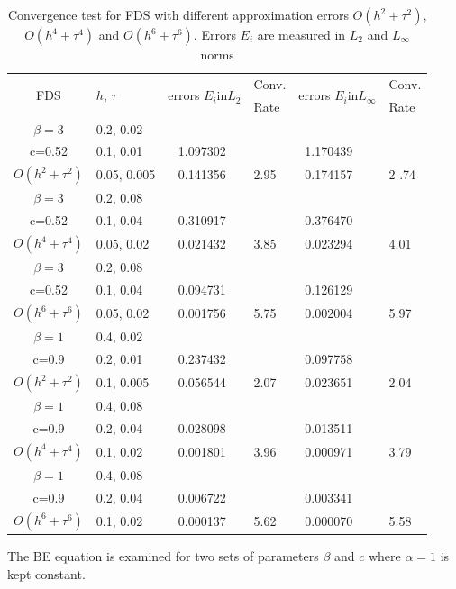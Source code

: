 \documentclass[11pt,a4paper,twoside]{article}
\begin{document}
\begin{table}[ht]
\centering
		\begin{tabular}{||c|l|ll|ll||}
			\hline
			\hline
      \multirow{2  }{*}{FDS}        & \multirow{2  }{*}{$h$, $\tau$}  & \multirow{2  }{*}{errors $E_i$in$L_2$}  &Conv.& \multirow{2  }{*}{errors $E_i$in$L_\infty$}  &Conv.  \\
	         &                    &                               & Rate   &                                        & Rate \\
   			\hline 
					\hline 
  $\beta=3$       &0.2, 0.02   &            &        &                  &      \\
      c=0.52   &0.1, 0.01   &~ 1.097302 &           &~1.170439      &       \\
     $O(h^2 + \tau^ 2)$ &0.05, 0.005 &~ 0.141356 &2.95  &~0.174157 & 2 .74       \\
			\hline 
   $\beta=3$        &0.2, 0.08   &            &        &                  &      \\
   c=0.52   &0.1, 0.04   &~ 0.310917 &           &~0.376470      &       \\
     $O(h^4+ \tau^4)$ &0.05, 0.02 &~ 0.021432 &3.85 &~0.023294 & 4.01        \\
			\hline 
  $\beta=3$               &0.2, 0.08   &            &        &                  &      \\
   c=0.52                  &0.1, 0.04       &~ 0.094731 &           &~0.126129      &       \\
     $O(h^6+ \tau^6)$ &0.05, 0.02 &~ 0.001756 &5.75    &~0.002004 & 5.97       \\
	   \hline
			\hline 
       $\beta=1$       &0.4, 0.02        &             &            &           &   \\
                  c=0.9    &0.2, 0.01       &~ 0.237432  &            &~0.097758 &   \\
  $O(h^2+ \tau^2)$ &0.1, 0.005   &~ 0.056544  &2.07  &~0.023651 & 2.04 \\
			\hline
      $\beta=1$    &0.4, 0.08    &            &            &             &    \\
       c=0.9 &0.2, 0.04    &~ 0.028098   &           &~0.013511  &   \\
       $O(h^4+ \tau^4)$ &0.1, 0.02   &~ 0.001801 & 3.96    &~0.000971  & 3.79  \\
    \hline
  $\beta=1$     &0.4, 0.08   &            &          &                  &      \\
      c=0.9    &0.2, 0.04   &~ 0.006722 &           &~0.003341      &       \\
     $O(h^6+ \tau^6)$ &0.1, 0.02 &~ 0.000137 &5.62  &~0.000070 & 5.58        \\
	   \hline
			\hline 
		\end{tabular}
		\caption{Convergence test for FDS with different approximation errors $O(h^{2} + \tau^2 )$, $O(h^{4} + \tau^4 )$ and $O(h^{6} + \tau^6 )$. Errors $E_i$ are measured in $L_2$ and $L_\infty$ norms}
\label{tab:a}
\end{table}
The BE equation  is examined for two sets of parameters $\beta$ and $c$ where $\alpha = 1$ is kept constant. 
\end{document}
